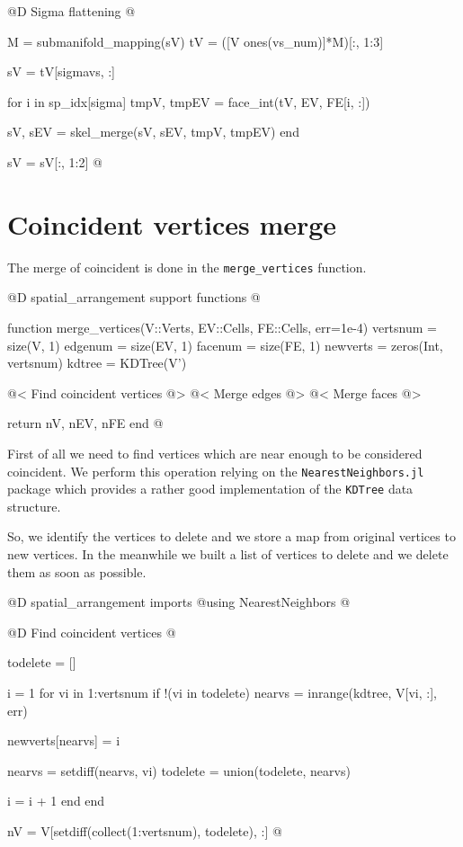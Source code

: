 @D Sigma flattening
@{M = submanifold_mapping(sV)
tV = ([V ones(vs_num)]*M)[:, 1:3]

sV = tV[sigmavs, :]

for i in sp_idx[sigma]
    tmpV, tmpEV = face_int(tV, EV, FE[i, :])
    
    sV, sEV = skel_merge(sV, sEV, tmpV, tmpEV)
end

sV = sV[:, 1:2]
@}



\section{Coincident vertices merge}
\label{sec:3D_merge_vertices}

The merge of coincident is done in the \texttt{merge\_vertices}
function.

@D spatial\_arrangement support functions
@{function merge_vertices(V::Verts, EV::Cells, FE::Cells, err=1e-4)
    vertsnum = size(V, 1)
    edgenum = size(EV, 1)
    facenum = size(FE, 1)
    newverts = zeros(Int, vertsnum)
    kdtree = KDTree(V')

    @< Find coincident vertices @>
    @< Merge edges @>
    @< Merge faces @>

    return nV, nEV, nFE
end
@}

First of all we need to find vertices which are near enough
to be considered coincident. We perform this operation
relying on the \texttt{NearestNeighbors.jl} package\cite{NearestNeighbors}
which provides a rather good implementation of the \texttt{KDTree} data structure.

So, we identify the vertices to delete and we store a map
from original vertices to new vertices. In the meanwhile
we built a list of vertices to delete and we delete them 
as soon as possible.

@D spatial\_arrangement imports
@{using NearestNeighbors
@}

@D Find coincident vertices
@{todelete = []

i = 1
for vi in 1:vertsnum
    if !(vi in todelete)
        nearvs = inrange(kdtree, V[vi, :], err)

        newverts[nearvs] = i

        nearvs = setdiff(nearvs, vi)
        todelete = union(todelete, nearvs)

        i = i + 1
    end
end

nV = V[setdiff(collect(1:vertsnum), todelete), :]
@}

